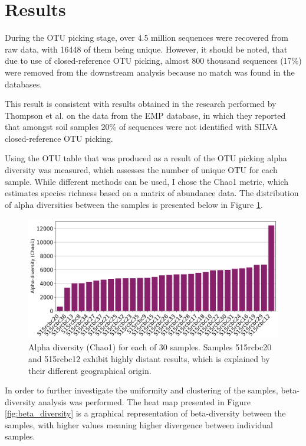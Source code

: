 \documentclass[12pt,twocolumn]{article} %
\begin{document}
\section{Results} 
During the OTU picking stage, over 4.5 million sequences were recovered from raw data, with 16448 of them being unique. However, it should be noted, that due to use of closed-reference OTU picking, almost 800 thousand sequences (17\%) were removed from the downstream analysis because no match was found in the databases. 
\par
This result is consistent with results obtained in the research performed by Thompson et al.\cite{Thompson2017} on the data from the EMP database, in which they reported that amongst soil samples 20\% of sequences were not identified with SILVA closed-reference OTU picking.
\par
Using the OTU table that was produced as a result of the OTU picking alpha diversity was measured, which assesses the number of unique OTU for each sample. While different methods can be used, I chose the Chao1 metric, which estimates species richness based on a matrix of abundance data. 
The distribution of alpha diversities between the samples is presented below in Figure \ref{fig:alpha_diversity}.
\begin{figure}[ht!] %
	\includegraphics[width=\linewidth]{chao1_alpha.png}
	\caption{Alpha diversity (Chao1) for each of 30 samples. Samples 515rcbc20 and 515rcbc12 exhibit highly distant results, which is explained by their different geographical origin.}
	\label{fig:alpha_diversity}
\end{figure}
\par
In order to further investigate the uniformity and clustering of the samples, beta-diversity analysis was performed. The heat map presented in Figure \ref{fig:beta_diversity} is a graphical representation of beta-diversity between the samples, with higher values meaning higher divergence between individual samples.
\end{document}
